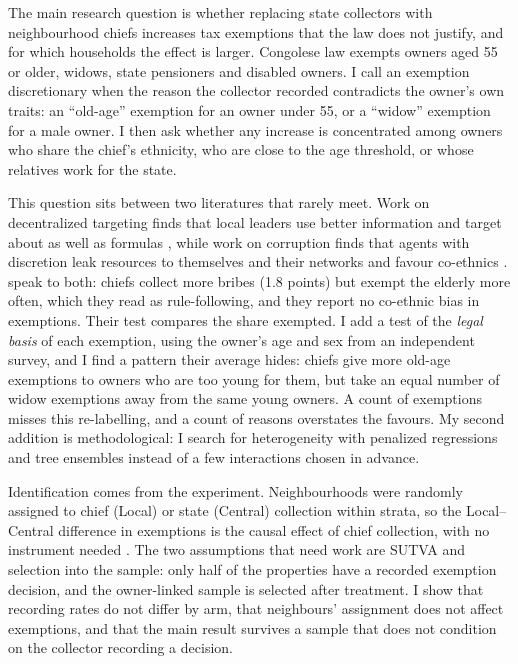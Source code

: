 \documentclass[11pt]{article}
\begin{document}
The main research question is whether replacing state collectors with neighbourhood chiefs increases tax exemptions that the law does not justify, and for which households the effect is larger. Congolese law exempts owners aged 55 or older, widows, state pensioners and disabled owners. I call an exemption discretionary when the reason the collector recorded contradicts the owner's own traits: an ``old-age'' exemption for an owner under 55, or a ``widow'' exemption for a male owner. I then ask whether any increase is concentrated among owners who share the chief's ethnicity, who are close to the age threshold, or whose relatives work for the state.

This question sits between two literatures that rarely meet. Work on decentralized targeting finds that local leaders use better information and target about as well as formulas \citep{alatas2012,basurto2020,bardhan2006}, while work on corruption finds that agents with discretion leak resources to themselves and their networks \citep{olken2007,olken2012,khan2016} and favour co-ethnics \citep{burgess2015,fisman2017}. \citet{balan2022} speak to both: chiefs collect more bribes (1.8 points) but exempt the elderly more often, which they read as rule-following, and they report no co-ethnic bias in exemptions. Their test compares the share exempted. I add a test of the \emph{legal basis} of each exemption, using the owner's age and sex from an independent survey, and I find a pattern their average hides: chiefs give more old-age exemptions to owners who are too young for them, but take an equal number of widow exemptions away from the same young owners. A count of exemptions misses this re-labelling, and a count of reasons overstates the favours. My second addition is methodological: I search for heterogeneity with penalized regressions and tree ensembles \citep{wager2018,athey2019} instead of a few interactions chosen in advance.

Identification comes from the experiment. Neighbourhoods were randomly assigned to chief (Local) or state (Central) collection within strata, so the Local--Central difference in exemptions is the causal effect of chief collection, with no instrument needed \citep{balan2022}. The two assumptions that need work are SUTVA and selection into the sample: only half of the properties have a recorded exemption decision, and the owner-linked sample is selected after treatment. I show that recording rates do not differ by arm, that neighbours' assignment does not affect exemptions, and that the main result survives a sample that does not condition on the collector recording a decision.
\end{document}
